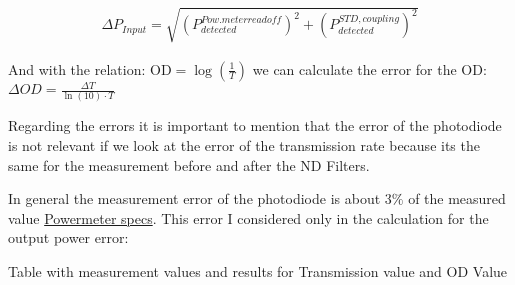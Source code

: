 \begin{align}
    \Delta P_{Input} = \sqrt{(P^{Pow.meter read off}_{detected})^2 + (P^{STD, coupling}_{detected})^2}
\end{align}

And with the relation: $\text{OD}= \log(\frac{1}{T})$ we can calculate the error for the OD:
$\Delta OD = \frac{\Delta T}{\ln(10) \cdot T}$ 

Regarding the errors it is important to mention that the error of the photodiode is not relevant if we look at the error
of the transmission rate because its the same for the measurement before and after the ND Filters.

In general the measurement error of the photodiode is about 3$\%$ of the measured value \href{https://www.thorlabs.com/newgrouppage9.cfm?objectgroup_id=3328 Thorlabs - Powermeter specs}{Powermeter specs}.
This error I considered only in the calculation for the output power error:

Table with measurement values and results for Transmission value and OD Value


